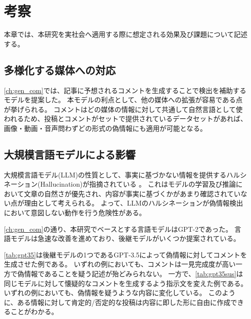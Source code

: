 \chapter{考察}
\label{ch:discussion}
本章では、本研究を実社会へ適用する際に想定される効果及び課題について記述する。

\section{多様化する媒体への対応}
\cref{ch:gen_com}では、記事に予想されるコメントを生成することで検出を補助するモデルを提案した。
本モデルの利点として、他の媒体への拡張が容易である点が挙げられる。
コメントはどの媒体の情報に対して共通して自然言語として使われるため、投稿とコメントがセットで提供されているデータセットがあれば、画像・動画・音声問わずどの形式の偽情報にも適用が可能となる。

\section{大規模言語モデルによる影響}
大規模言語モデル(LLM)の性質として、事実に基づかない情報を提供するハルシネーション(Hallucination)が指摘されている \cite{Alkaissi2023-bo}。
これはモデルの学習及び推論において文章の自然さが優先され、内容が事実に基づくかがあまり確認されていない点が理由として考えられる。
よって、LLMのハルシネーションが偽情報検出において意図しない動作を行う危険性がある。

\cref{ch:gen_com}の通り、本研究でベースとする言語モデルはGPT-2であった。
言語モデルは急速な改善を進めており、後継モデルがいくつか提案されている。

\cref{tab:gpt35}は後継モデルの1つであるGPT-3.5によって偽情報に対してコメントを生成させた例である。
いずれの例においても、コメントは一見完成度が高い一方で偽情報であることを疑う記述が殆どみられない。
一方で、\cref{tab:gpt35sus}は同じモデルに対して懐疑的なコメントを生成するよう指示文を変えた例である。
いずれの例においても、偽情報を疑うような内容に変化している。
このように、ある情報に対して肯定的/否定的な投稿は内容に即した形に自由に作成できることがわかる。

